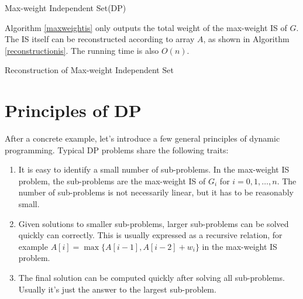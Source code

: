 \begin{algorithm}[ht]
\caption{Max-weight Independent Set(DP)}\label{maxweightis}
\begin{algorithmic}[1]
\EndFor
\end{algorithmic}
\end{algorithm}
Algorithm \ref{maxweightis} only outputs the total weight of the max-weight IS of $G$. The IS itself can be reconstructed according to array $A$, as shown in Algorithm \ref{reconstructionis}. The running time is also $O(n)$.

\begin{algorithm}[ht]
\caption{Reconstruction of Max-weight Independent Set}\label{reconstructionis}
\begin{algorithmic}[1]
\Else
{}
\EndIf
\EndWhile
{}
\EndIf
\end{algorithmic}
\end{algorithm}
\section{Principles of DP}
After a concrete example, let's introduce a few general principles of dynamic programming. Typical DP problems  share the following traits:
\begin{enumerate}
\item It is easy to identify a small number of sub-problems. In the max-weight IS problem, the sub-problems are the max-weight IS of $G_i$ for $i=0,1,\dots,n$. The number of sub-problems is not necessarily linear, but it has to be reasonably small.
\item Given solutions to smaller sub-problems, larger sub-problems can be solved quickly can correctly. This is usually expressed as a recursive relation, for example $A[i]=\max\{A[i-1],A[i-2]+w_i\}$ in the max-weight IS problem.
\item The final solution can be computed quickly after solving all sub-problems. Usually it's just the answer to the largest sub-problem.
\end{enumerate}
